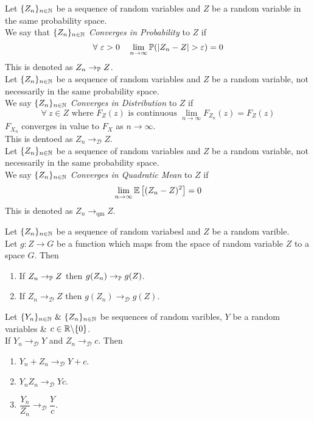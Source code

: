 \documentclass[11pt,a4paper]{article}
\begin{document}
Let $\{Z_n\}_{n\in\mathbb{N}}$ be a sequence of random variables and $Z$ be a random variable in the same probability space.\\
We say that $\{Z_n\}_{n\in\mathbb{N}}$ \textit{Converges in Probability} to $Z$ if
$$\forall\ \varepsilon>0\quad\lim_{n\to\infty}\prob(|Z_n-Z|>\varepsilon)=0$$
\nb This is denoted as $Z_n\to_{\mathbb{P}} Z$.\\

Let $\{Z_n\}_{n\in\mathbb{N}}$ be a sequence of random variables and $Z$ be a random variable, not necessarily in the same probability space.\\
We say $\{Z_n\}_{n\in\mathbb{N}}$ \textit{Converges in Distribution} to $Z$ if
$$\forall\ z\in Z\text{ where }F_Z(z)\text{ is continuous }\lim_{n\to\infty}F_{Z_n}(z)=F_Z(z)$$
\ie $F_{X_n}$ converges in value to $F_X$ as $n\to\infty$.\\
\nb This is dentoed as $Z_n\to_\mathcal{D}Z$.\\

Let $\{Z_n\}_{n\in\mathbb{N}}$ be a sequence of random variables and $Z$ be a random variable, not necessarily in the same probability space.\\
We say $\{Z_n\}_{n\in\mathbb{N}}$ \textit{Converges in Quadratic Mean} to $Z$ if
$$\lim_{n\to\infty}\mathbb{E}\left[(Z_n-Z)^2\right]=0$$
\nb This is denoted as $Z_n\to_\text{qm}Z$.\\




Let $\{Z_n\}_{n\in\mathbb{N}}$ be a sequence of random variabesl and $Z$ be a random varible.\\
Let $g:Z\to G$ be a function which maps from the space of random variable $Z$ to a space $G$. Then
\begin{enumerate}
	\item If $Z_n\to_{\mathbb{P}} Z$ then $g(Z_n)\to_{\mathbb{P}} g(Z)$.
	\item If $Z_n\to_\mathcal{D}Z$ then $g(Z_n)\to_\mathcal{D}g(Z)$.
\end{enumerate}

Let $\{Y_n\}_{n\in\nats}\ \&\ \{Z_n\}_{n\in\nats}$ be sequences of random varibles, $Y$ be a random variables \& $c\in\mathbb{R}\backslash\{0\}$.\\
If $Y_n\to_\mathcal{D} Y$ and $Z_n\to_\mathcal{D} c$. Then
\begin{enumerate}
	\item $Y_n+Z_n\to_\mathcal{D}Y+c$.
	\item $Y_nZ_n\to_\mathcal{D}Yc$.
	\item $\dfrac{Y_n}{Z_n}\to_\mathcal{D}\dfrac{Y}{c}$.
\end{enumerate}
\end{document}
